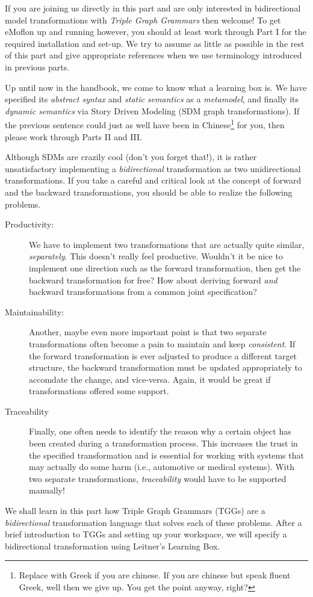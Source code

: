 \genHeader
\label{chap:Learning-Box-to-Dictionary-and-Back-Again}


If you are joining us directly in this part and are only interested in bidirectional model transformations with \emph{Triple Graph Grammars} then welcome! To
get eMoflon up and running however, you should at least work through Part I for the required installation and set-up. We try to assume as little as possible in
the rest of this part and give appropriate references when we use terminology introduced in previous parts.

Up until now in the handbook, we come to know what a learning box is. We have specified its \emph{abstract syntax} and \emph{static semantics} as a
\emph{metamodel}, and finally its \emph{dynamic semantics} via Story Driven Modeling (SDM graph transformations). If the previous sentence could just as well
have been in Chinese\footnote{Replace with Greek if you are chinese.  If you are chinese but speak fluent Greek, well then we give up. You get the point
anyway, right?} for you, then please work through Parts II and III.

Although SDMs are crazily cool (don't you forget that!), it is rather unsatisfactory implementing a \emph{bidirectional} transformation as two unidirectional
transformations. If you take a careful and critical look at the concept of forward and the backward transformations, you should be able to realize the following
problems.

\begin{description}
\item[Productivity:] We have to implement two transformations that are actually quite similar, \emph{separately}. This doesn't really feel productive.
Wouldn't it be nice to implement one direction such as the forward transformation, then get the backward transformation for free? How about deriving
forward \emph{and} backward transformations from a common joint specification?

\vspace{0.5cm}

\item[Maintainability:] Another, maybe even more important point is that two separate transformations often become a pain to maintain and keep
\emph{consistent}. If the forward transformation is ever adjusted to produce a different target structure, the backward transformation must be updated
appropriately to accomdate the change, and vice-versa.  Again, it would be great if transformations offered some support.

\item[Traceability] Finally, one often needs to identify the reason why a certain object has been created during a transformation process. This increases the
trust in the specified transformation and is essential for working with systems that may actually do some harm (i.e., automotive or medical     
systems). With two separate transformations, \emph{traceability} would have to be supported manually!
\end{description}

We shall learn in this part how Triple Graph Grammars (TGGs) are a \emph{bidirectional} transformation language that solves each of these problems. After a
brief introduction to TGGs and setting up your workspace, we will specify a bidirectional transformation using Leitner's Learning Box.
